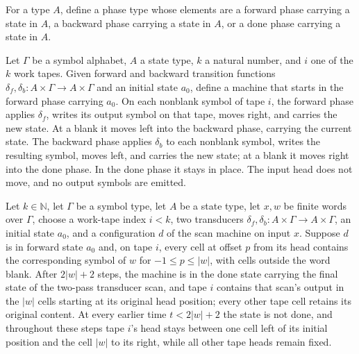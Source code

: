 \begin{definition}
\label{Turing.ScanPhase}
\leanok
For a type $A$, define a phase type whose elements are a forward phase carrying a state
in $A$, a backward phase carrying a state in $A$, or a done phase carrying a state in
$A$.
\end{definition}

\begin{definition}
\label{Turing.scanTM}
\leanok
{}
Let $\Gamma$ be a symbol alphabet, $A$ a state type, $k$ a natural number, and $i$ one
of the $k$ work tapes. Given forward and backward transition functions
$\delta_f,\delta_b:A\times\Gamma\to A\times\Gamma$ and an initial state $a_0$, define a
machine that starts in the forward phase carrying $a_0$. On each nonblank symbol of tape
$i$, the forward phase applies $\delta_f$, writes its output symbol on that tape, moves
right, and carries the new state. At a blank it moves left into the backward phase,
carrying the current state. The backward phase applies $\delta_b$ to each nonblank
symbol, writes the resulting symbol, moves left, and carries the new state; at a blank
it moves right into the done phase. In the done phase it stays in place. The input head
does not move, and no output symbols are emitted.
\end{definition}

\begin{theorem}
\label{Turing.scanTM_run_ofCfg}
\leanok
{}
Let $k\in\mathbb N$, let $\Gamma$ be a symbol type, let $A$ be a state type, let $x,w$
be finite words over $\Gamma$, choose a work-tape index $i<k$, two transducers
$\delta_f,\delta_b:A\times\Gamma\to A\times\Gamma$, an initial state $a_0$, and a
configuration $d$ of the scan machine on input $x$. Suppose $d$ is in forward state
$a_0$ and, on tape $i$, every cell at offset $p$ from its head contains the
corresponding symbol of $w$ for $-1\le p\le |w|$, with cells outside the word blank.
After $2|w|+2$ steps, the machine is in the done state carrying the final state of the
two-pass transducer scan, and tape $i$ contains that scan's output in the $|w|$ cells
starting at its original head position; every other tape cell retains its original
content. At every earlier time $t<2|w|+2$ the state is not done, and throughout these
steps tape $i$'s head stays between one cell left of its initial position and the cell
$|w|$ to its right, while all other tape heads remain fixed.
\end{theorem}

